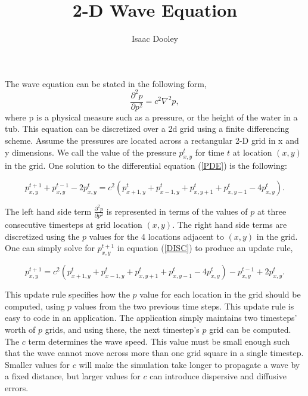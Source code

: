 \documentclass{article}
\begin{document}
\title{2-D Wave Equation}
\author{ Isaac Dooley }



\maketitle

The wave equation can be stated in the following form, 
\begin{equation}
\frac{\partial^2p}{\partial p^2}=c^2 \nabla^2 p ,\label{PDE}
\end{equation}
where p is a physical measure such as a pressure, or the height of the water in a tub. This equation can be discretized over a 2d grid using a finite differencing scheme. Assume the pressures are located across a rectangular 2-D grid in x and y dimensions. We call the value of the pressure $p_{x,y}^{t}$ for time $t$ at location $\left(x,y\right)$ in the grid. One solution to the differential equation (\ref{PDE}) is the following:

\begin{equation}
p_{x,y}^{t+1} + p_{x,y}^{t-1} -2 p_{x,y}^{t} = c^2 \left(p_{x+1,y}^{t}+p_{x-1,y}^{t}+p_{x,y+1}^{t}+p_{x,y-1}^{t}-4p_{x,y}^{t}\right).\label{DISC}
\end{equation}

The left hand side term $\frac{\partial^2p}{\partial p^2}$ is represented in terms of the values of $p$ at three consecutive timesteps at grid location $\left(x,y\right)$. The right hand side terms are discretized using the $p$ values for the 4 locations adjacent to $\left(x,y\right)$ in the grid. One can simply solve for $p_{x,y}^{t+1}$ in equation (\ref{DISC}) to produce an update rule, 

\begin{equation}
p_{x,y}^{t+1} = c^2 \left(p_{x+1,y}^{t}+p_{x-1,y}^{t}+p_{x,y+1}^{t}+p_{x,y-1}^{t}-4p_{x,y}^{t}\right)- p_{x,y}^{t-1} +2 p_{x,y}^{t} .
\end{equation}

This update rule specifies how the $p$ value for each location in the grid should be computed, using $p$ values from the two previous time steps. This update rule is easy to code in an application. The application simply maintains two timesteps' worth of $p$ grids, and using these, the next timestep's $p$ grid can be computed. The $c$ term determines the wave speed. This value must be small enough such that the wave cannot move across more than one grid square in a single timestep. Smaller values for $c$ will make the simulation take longer to propagate a wave by a fixed distance, but larger values for $c$ can introduce dispersive and diffusive errors.
\end{document}
